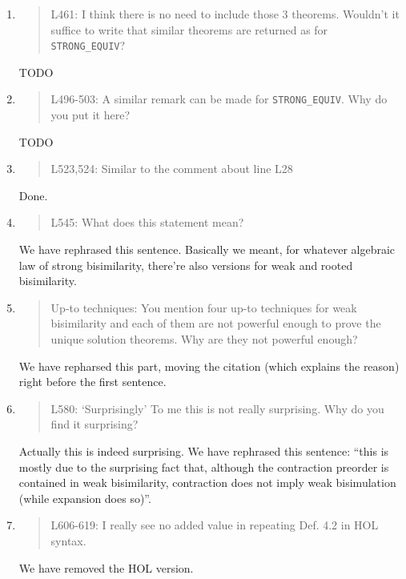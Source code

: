 \begin{enumerate}
\item \begin{quote}
    L461: I think there is no need to include those 3
    theorems. Wouldn’t it suffice to write that similar theorems are
    returned as for \texttt{STRONG\_EQUIV}?
  \end{quote}
  TODO
  
\item \begin{quote}
    L496-503: A similar remark can be made for \texttt{STRONG\_EQUIV}. Why do you put it here?
  \end{quote}
  TODO
  
\item \begin{quote}
    L523,524: Similar to the comment about line L28
  \end{quote}
  Done.
  
\item \begin{quote}
    L545: What does this statement mean?
  \end{quote}
  We have rephrased this sentence. Basically we meant, for whatever
  algebraic law of strong bisimilarity, there're also versions for
  weak and rooted bisimilarity.

\item \begin{quote}
    Up-to techniques: You mention four up-to techniques for weak
    bisimilarity and each of them are not powerful enough to prove the
    unique solution theorems. Why are they not powerful enough?
  \end{quote}

  We have repharsed this part, moving the citation
  \cite{sangiorgi1992problem} (which explains the reason) right before
  the first sentence.
  
\item \begin{quote}
    L580: ‘Surprisingly’ To me this is not really surprising. Why do you find it surprising?
  \end{quote}
  Actually this is indeed surprising. We have rephrased this sentence:
  ``this is mostly due to the surprising fact
  that, although the contraction preorder is contained in weak
bisimilarity, contraction does not imply weak bisimulation (while
expansion does so)''.

\item \begin{quote}
    L606-619: I really see no added value in repeating Def. 4.2 in HOL syntax.
  \end{quote}
  We have removed the HOL version.
  

\end{enumerate}
